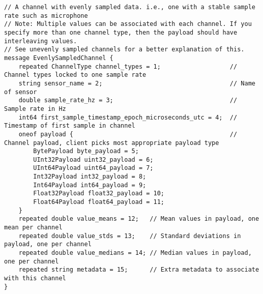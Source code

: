 \begin{lstlisting}
// A channel with evenly sampled data. i.e., one with a stable sample rate such as microphone
// Note: Multiple values can be associated with each channel. If you specify more than one channel type, then the payload should have interleaving values.
// See unevenly sampled channels for a better explanation of this.
message EvenlySampledChannel {
	repeated ChannelType channel_types = 1;                   // Channel types locked to one sample rate
	string sensor_name = 2;                                   // Name of sensor
	double sample_rate_hz = 3;                                // Sample rate in Hz
	int64 first_sample_timestamp_epoch_microseconds_utc = 4;  // Timestamp of first sample in channel
	oneof payload {                                           // Channel payload, client picks most appropriate payload type
		BytePayload byte_payload = 5;
		UInt32Payload uint32_payload = 6;
		UInt64Payload uint64_payload = 7;
		Int32Payload int32_payload = 8;
		Int64Payload int64_payload = 9;
		Float32Payload float32_payload = 10;
		Float64Payload float64_payload = 11;
	}
	repeated double value_means = 12;   // Mean values in payload, one mean per channel
	repeated double value_stds = 13;    // Standard deviations in payload, one per channel
	repeated double value_medians = 14; // Median values in payload, one per channel
	repeated string metadata = 15;      // Extra metadata to associate with this channel
}


\end{lstlisting}
